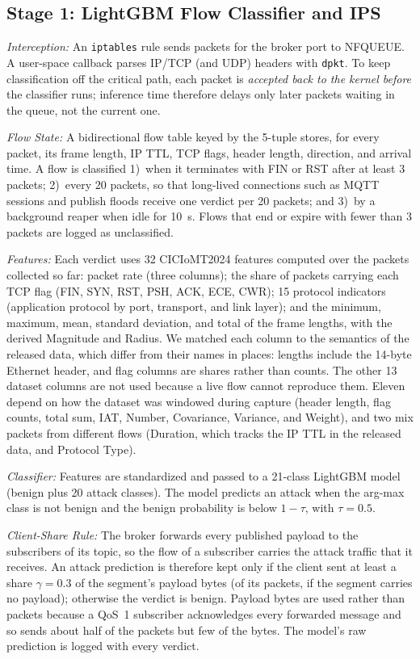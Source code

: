 \documentclass[journal]{IEEEtran}
\begin{document}
\subsection{Stage 1: LightGBM Flow Classifier and IPS}
\label{sec:stage1}

\textit{Interception:} An \texttt{iptables} rule sends packets for the broker port to NFQUEUE. A user-space callback parses IP/TCP (and UDP) headers with \texttt{dpkt}. To keep classification off the critical path, each packet is \emph{accepted back to the kernel before} the classifier runs; inference time therefore delays only later packets waiting in the queue, not the current one.

\textit{Flow State:} A bidirectional flow table keyed by the 5-tuple stores, for every packet, its frame length, IP TTL, TCP flags, header length, direction, and arrival time. A flow is classified 1)~when it terminates with FIN or RST after at least 3 packets; 2)~every 20 packets, so that long-lived connections such as MQTT sessions and publish floods receive one verdict per 20 packets; and 3)~by a background reaper when idle for 10~s. Flows that end or expire with fewer than 3 packets are logged as unclassified.

\textit{Features:} Each verdict uses 32 CICIoMT2024 features computed over the packets collected so far: packet rate (three columns); the share of packets carrying each TCP flag (FIN, SYN, RST, PSH, ACK, ECE, CWR); 15 protocol indicators (application protocol by port, transport, and link layer); and the minimum, maximum, mean, standard deviation, and total of the frame lengths, with the derived Magnitude and Radius. We matched each column to the semantics of the released data, which differ from their names in places: lengths include the 14-byte Ethernet header, and flag columns are shares rather than counts. The other 13 dataset columns are not used because a live flow cannot reproduce them. Eleven depend on how the dataset was windowed during capture (header length, flag counts, total sum, IAT, Number, Covariance, Variance, and Weight), and two mix packets from different flows (Duration, which tracks the IP TTL in the released data, and Protocol Type).

\textit{Classifier:} Features are standardized and passed to a 21-class LightGBM model~\cite{lightgbm2017} (benign plus 20 attack classes). The model predicts an attack when the arg-max class is not benign and the benign probability is below $1-\tau$, with $\tau = 0.5$.

\textit{Client-Share Rule:} The broker forwards every published payload to the subscribers of its topic, so the flow of a subscriber carries the attack traffic that it receives. An attack prediction is therefore kept only if the client sent at least a share $\gamma = 0.3$ of the segment's payload bytes (of its packets, if the segment carries no payload); otherwise the verdict is benign. Payload bytes are used rather than packets because a QoS~1 subscriber acknowledges every forwarded message and so sends about half of the packets but few of the bytes. The model's raw prediction is logged with every verdict.
\end{document}
